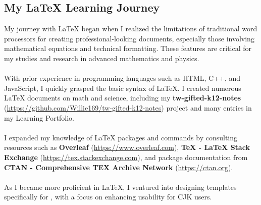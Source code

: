 \documentclass[a4paper,12pt]{article}
\begin{document}
\subsection{My \LaTeX{} Learning Journey}
My journey with \LaTeX{} began when I realized the limitations of traditional word processors for creating professional-looking documents, especially those involving mathematical equations and technical formatting. These features are critical for my studies and research in advanced mathematics and physics.\\\\
With prior experience in programming languages such as HTML, C++, and JavaScript, I quickly grasped the basic syntax of \LaTeX. I created numerous \LaTeX{} documents on math and science, including my \textbf{tw-gifted-k12-notes} (\href{https://github.com/Willie169/tw-gifted-k12-notes}{https://github.com/Willie169/tw-gifted-k12-notes}) project and many entries in my Learning Portfolio.\\\\
I expanded my knowledge of \LaTeX{} packages and commands by consulting resources such as \textbf{Overleaf} (\href{https://www.overleaf.com}{https://www.overleaf.com}), \textbf{TeX - LaTeX Stack Exchange} (\href{https://tex.stackexchange.com}{https://tex.stackexchange.com}), and package documentation from \textbf{CTAN - Comprehensive TEX Archive Network} (\href{https://ctan.org}{https://ctan.org}).\\\\
As I became more proficient in \LaTeX, I ventured into designing templates specifically for \XeTeX, with a focus on enhancing usability for CJK users.
\end{document}
